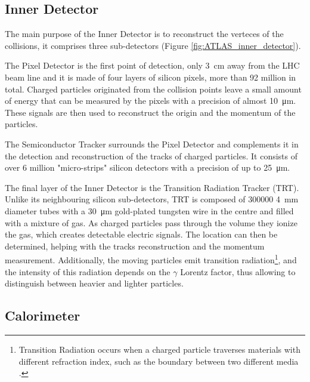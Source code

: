 \subsection{Inner Detector}\label{sec:ATLAS_inner_detector}
\marginpar{\flushleft }
The main purpose of the Inner Detector is to reconstruct the verteces of the collisions, it comprises three sub-detectors (Figure \ref{fig:ATLAS_inner_detector}).

The Pixel Detector is the first point of detection, only \qty{3}{\centi\meter} away from the LHC beam line and it is made of four layers of silicon pixels, more than 92 million in total. Charged particles originated from the collision points leave a small amount of energy that can be measured by the pixels with a precision of almost \qty{10}{\micro\meter}. These signals are then used to reconstruct the origin and the momentum of the particles.

The Semiconductor Tracker surrounds the Pixel Detector and complements it in the detection and reconstruction of the tracks of charged particles. It consists of over 6 million "micro-strips" silicon detectors with a precision of up to \qty{25}{\micro\meter}.

The final layer of the Inner Detector is the Transition Radiation Tracker (TRT). Unlike its neighbouring silicon sub-detectors, TRT is composed of \num{300000} \qty{4}{\milli\meter} diameter tubes with a \qty{30}{\micro\meter} gold-plated tungsten wire in the centre and filled with a mixture of gas. As charged particles pass through the volume they ionize the gas, which creates detectable electric signals. The location can then be determined, helping with the tracks reconstruction and the momentum measurement. Additionally, the moving particles emit transition radiation\footnote{Transition Radiation occurs when a charged particle traverses materials with different refraction index, such as the boundary between two different media \cite{wikipediaTransitionRadiation}.}, and the intensity of this radiation depends on the $\gamma$ Lorentz factor, thus allowing to distinguish between heavier and lighter particles.


\subsection{Calorimeter}\label{sec:ATLAS_calorimeter}


